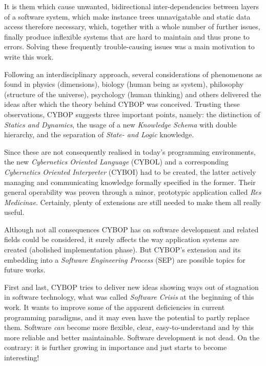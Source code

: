 It is them which cause unwanted, bidirectional inter-dependencies between
layers of a software system, which make instance trees unnavigatable and static
data access therefore necessary, which, together with a whole number of further
issues, finally produce inflexible systems that are hard to maintain and thus
prone to errors. Solving these frequently trouble-causing issues was a main
motivation to write this work.

Following an interdisciplinary approach, several considerations of phenomenons
as found in physics (dimensions), biology (human being as system), philosophy
(structure of the universe), psychology (human thinking) and others delivered
the ideas after which the theory behind CYBOP was conceived. Trusting these
observations, CYBOP suggests three important points, namely: the distinction of
\emph{Statics and Dynamics}, the usage of a new \emph{Knowledge Schema} with
double hierarchy, and the separation of \emph{State- and Logic} knowledge.

Since these are not consequently realised in today's programming environments,
the new \emph{Cybernetics Oriented Language} (CYBOL) and a corresponding
\emph{Cybernetics Oriented Interpreter} (CYBOI) had to be created, the latter
actively managing and communicating knowledge formally specified in the former.
Their general operability was proven through a minor, prototypic application
called \emph{Res Medicinae}. Certainly, plenty of extensions are still needed
to make them all really useful.

Although not all consequences CYBOP has on software development and related
fields could be considered, it surely affects the way application systems are
created (abolished implementation phase). But CYBOP's extension and its
embedding into a \emph{Software Engineering Process} (SEP) are possible topics
for future works.

First and last, CYBOP tries to deliver new ideas showing ways out of stagnation
in software technology, what was called \emph{Software Crisis} at the beginning
of this work. It wants to improve some of the apparent deficiencies in current
programming paradigms, and it may even have the potential to partly replace
them. Software \emph{can} become more flexible, clear, easy-to-understand and
by this more reliable and better maintainable. Software development is not
dead. On the contrary: it is further growing in importance and just starts to
become interesting!

